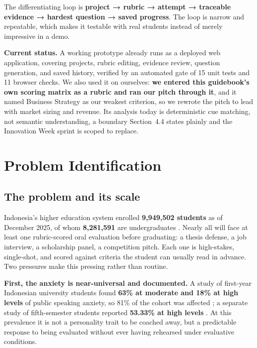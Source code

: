 The differentiating loop is \textbf{project → rubric →
attempt → traceable evidence → hardest question
→ saved progress}. The loop is narrow and repeatable, which makes it
testable with real students instead of merely impressive in a demo.

\textbf{Current status.} A working prototype already runs as a deployed web
application, covering projects, rubric editing, evidence review, question
generation, and saved history, verified by an automated gate of 15 unit tests
and 11 browser checks. We also used it on ourselves: \textbf{we entered this
guidebook's own scoring matrix as a rubric and ran our pitch through it}, and it
named Business Strategy as our weakest criterion, so we rewrote the pitch to
lead with market sizing and revenue. Its analysis today is deterministic cue
matching, not semantic understanding, a boundary Section~4.4 states plainly and
the Innovation Week sprint is scoped to replace.

\section{Problem Identification}

\subsection{The problem and its scale}

Indonesia's higher education system enrolled \textbf{9,949,502 students} as of
December 2025, of whom \textbf{8,281,591} are undergraduates
\cite{pddikti2025}. Nearly all will face at least one rubric-scored oral
evaluation before graduating: a thesis defense, a job interview, a scholarship
panel, a competition pitch. Each one is high-stakes, single-shot, and scored
against criteria the student can usually read in advance. Two pressures make this
pressing rather than routine.

\textbf{First, the anxiety is near-universal and documented.} A study of
first-year Indonesian university students found \textbf{63\% at moderate and
18\% at high levels} of public speaking anxiety, so 81\% of the cohort was
affected
\cite{educasia2024}; a separate study of fifth-semester students reported
\textbf{53.33\% at high levels} \cite{leea2023}. At this prevalence it is not a
personality trait to be coached away, but a predictable response to being
evaluated without ever having rehearsed under evaluative conditions.

